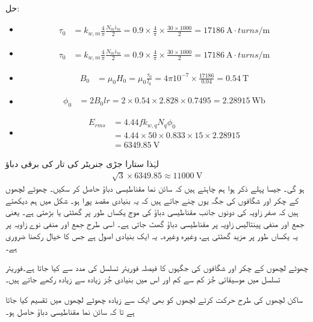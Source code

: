 حل:
\begin{itemize}
\item
\begin{align*}
\tau_0&=k_{w,m} \frac{4}{\pi}\frac{N_m i_m}{2}=0.9 \times \frac{4}{\pi} \times \frac{30 \times 1000}{2}=\SI{17186}{\ampere \cdot turns \per \meter}
\end{align*}
\item
\begin{align*}
\tau_0&=k_{w,m} \frac{4}{\pi}\frac{N_m i_m}{2}=0.9 \times \frac{4}{\pi} \times \frac{30 \times 1000}{2}=\SI{17186}{\ampere \cdot turns \per \meter}
\end{align*}
\item
\begin{align*}
B_0&=\mu_0 H_0=\mu_0 \frac{\tau_0}{l_k}=4 \pi 10^{-7} \times \frac{17186}{0.04}=\SI{0.54}{\tesla}
\end{align*}
\item
\begin{align*}
\phi_0&=2 B_0 l r =2 \times 0.54 \times 2.828 \times 0.7495=\SI{2.28915}{\weber}
\end{align*}
\item
\begin{align*}
E_{rms}&=4.44 f k_{w,q} N_q \phi_0\\
&=4.44 \times 50 \times 0.833 \times 15 \times 2.28915\\
&=\SI{6349.85}{\volt} 
\end{align*}
\end{itemize}
لہٰذا ستارا جڑی جنریٹر کی تار کی برقی دباؤ
\begin{align*}
\sqrt{3} \times 6349.85 \approx \SI{11000}{\volt}
\end{align*}
ہو گی۔
%
جیسا پہلے ذکر ہوا ہم چاہتے ہیں کہ سائن نما مقناطیسی دباؤ حاصل کر سکیں۔ چھوٹے لچھوں کے چکر اور شگافوں کی جگہ یوں چنے جاتے ہیں کہ یہ بنیادی مقصد پورا ہو۔ شکل   میں ہم دیکھتے ہیں کہ صفر زاویہ کی دونوں جانب مقناطیسی دباؤ کی موج یکساں طور پر گھٹتی یا بڑھتی ہے۔ یعنی جمع اور منفی  پینتالیس زاویہ پر مقناطیسی دباؤ    گھٹ جاتی ہے۔ اسی طرح جمع اور منفی نوے زاویہ پر یہ یکساں طور پر مزید گھٹتی ہے، وغیرہ وغیرہ۔ یہ ایک بنیادی اصول ہے جس کا خیال رکھنا ضروری ہے۔

چھوٹے لچھوں کے چکر اور شگافوں کی جگہوں کا فیصلہ فوریئر تسلسل کی مدد سے کیا جاتا ہے۔فوریئر تسلسل میں موسیقائی جُز کم سے کم اور اس میں بنیادی جُز زیادہ سے زیادہ رکھے جاتے ہیں۔

ساکن لچھوں کی طرح حرکت کرتے لچھوں کو بھی ایک سے زیادہ چھوٹے لچھوں میں تقسیم کیا جاتا ہے تا کہ سائن نما مقناطیسی دباؤ حاصل ہو۔

